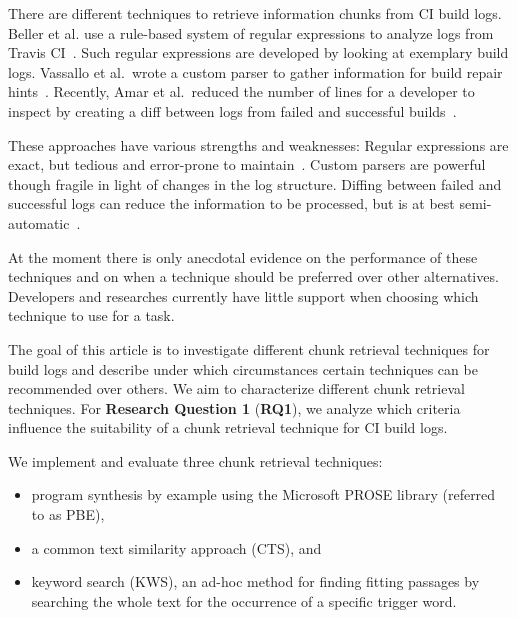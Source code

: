 There are different techniques to retrieve information chunks from CI
build logs. Beller et al. use a rule-based system of regular
expressions to analyze logs from Travis CI~\cite{beller2017oops}.
Such regular expressions are developed by looking at exemplary build
logs.  Vassallo et al.\ wrote a custom parser to gather information
for build repair hints~\cite{vassallo2018un-break}.  Recently, Amar et
al.\ reduced the number of lines for a developer to inspect by
creating a diff between logs from failed and successful
builds~\cite{amar2019mining}.

These approaches have various strengths and weaknesses: Regular
expressions are exact, but tedious and error-prone to
maintain~\cite{michael2019regexes}.  Custom parsers are powerful
though fragile in light of changes in the log structure. Diffing
between failed and successful logs can reduce the information to be
processed, but is at best semi-automatic~\cite{amar2019mining}.

At the moment there is only anecdotal evidence on the performance of these techniques and on when a technique should be preferred over other alternatives.
Developers and researches currently have little support when choosing which technique to use for a task.

The goal of this article is to investigate different chunk retrieval techniques for build logs and describe under which circumstances certain techniques can be recommended over others.
We aim to characterize different chunk retrieval techniques.
For \textbf{Research Question 1} (\textbf{RQ1}), we analyze which criteria influence the suitability of a chunk retrieval technique for CI build logs.

We implement and evaluate three chunk retrieval techniques:
\begin{itemize}
  \item program synthesis by example using the Microsoft PROSE library (referred to as PBE),
  \item a common text similarity approach (CTS), and
  \item keyword search (KWS), an ad-hoc method for finding fitting passages by searching the whole text for the occurrence of a specific trigger word.
\end{itemize}

